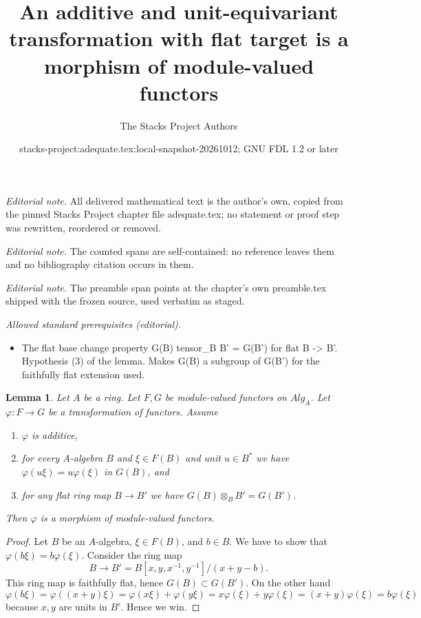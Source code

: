 \documentclass{stacks-project}
\title{An additive and unit-equivariant transformation with flat target is a morphism of module-valued functors}
\author{The Stacks Project Authors}
\date{stacks-project:adequate.tex:local-snapshot-20261012; GNU FDL 1.2 or later}
\theoremstyle{plain}
\newtheorem{lemma}[subsection]{Lemma}
\theoremstyle{definition}
\theoremstyle{remark}
\numberwithin{equation}{subsection}
\begin{document}
\maketitle
\noindent\textit{Editorial note.} All delivered mathematical text is the author's own, copied from the pinned Stacks Project chapter file adequate.tex; no statement or proof step was rewritten, reordered or removed.\par\medskip
\noindent\textit{Editorial note.} The counted spans are self-contained: no reference leaves them and no bibliography citation occurs in them.\par\medskip
\noindent\textit{Editorial note.} The preamble span points at the chapter's own preamble.tex shipped with the frozen source, used verbatim as staged.\par\medskip
\noindent\textit{Allowed standard prerequisites (editorial).}\begin{itemize}
\item The flat base change property G(B) tensor\_B B' = G(B') for flat B -> B'. Hypothesis (3) of the lemma. Makes G(B) a subgroup of G(B') for the faithfully flat extension used.
\end{itemize}\medskip
\begin{lemma}
\label{lemma-flat-linear-functor}
Let $A$ be a ring.
Let $F, G$ be module-valued functors on $\textit{Alg}_A$.
Let $\varphi : F \to G$ be a transformation of functors. Assume
\begin{enumerate}
\item $\varphi$ is additive,
\item for every $A$-algebra $B$ and $\xi \in F(B)$ and unit
$u \in B^*$ we have $\varphi(u\xi) = u\varphi(\xi)$ in $G(B)$, and
\item for any flat ring map $B \to B'$ we have
$G(B) \otimes_B B' = G(B')$.
\end{enumerate}
Then $\varphi$ is a morphism of module-valued functors.
\end{lemma}

\begin{proof}
Let $B$ be an $A$-algebra, $\xi \in F(B)$, and $b \in B$. We have to show
that $\varphi(b \xi) = b \varphi(\xi)$. Consider the ring map
$$
B \to B' = B[x, y, x^{-1}, y^{-1}]/(x + y - b).
$$
This ring map is faithfully flat, hence $G(B) \subset G(B')$. On the
other hand
$$
\varphi(b\xi) = \varphi((x + y)\xi) =
\varphi(x\xi) + \varphi(y\xi) = x\varphi(\xi) + y\varphi(\xi)
= (x + y)\varphi(\xi) = b\varphi(\xi)
$$
because $x, y$ are units in $B'$. Hence we win.
\end{proof}
\end{document}
